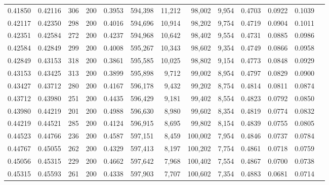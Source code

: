 \begin{tabular}{rrrrrrrrrrrrr}
0.41850 & 0.42116 &   306 & 200 &                                     0.3953 & 594,398 &  11,212 &  98,002 &   9,954 & 0.4703 & 0.0922 & 0.1039 \\
0.42117 & 0.42350 &   298 & 200 &                                     0.4016 & 594,696 &  10,914 &  98,202 &   9,754 & 0.4719 & 0.0904 & 0.1011 \\
0.42351 & 0.42584 &   272 & 200 &                                     0.4237 & 594,968 &  10,642 &  98,402 &   9,554 & 0.4731 & 0.0885 & 0.0986 \\
0.42584 & 0.42849 &   299 & 200 &                                     0.4008 & 595,267 &  10,343 &  98,602 &   9,354 & 0.4749 & 0.0866 & 0.0958 \\
0.42849 & 0.43153 &   318 & 200 &                                     0.3861 & 595,585 &  10,025 &  98,802 &   9,154 & 0.4773 & 0.0848 & 0.0929 \\
0.43153 & 0.43425 &   313 & 200 &                                     0.3899 & 595,898 &   9,712 &  99,002 &   8,954 & 0.4797 & 0.0829 & 0.0900 \\
0.43427 & 0.43712 &   280 & 200 &                                     0.4167 & 596,178 &   9,432 &  99,202 &   8,754 & 0.4814 & 0.0811 & 0.0874 \\
0.43712 & 0.43980 &   251 & 200 &                                     0.4435 & 596,429 &   9,181 &  99,402 &   8,554 & 0.4823 & 0.0792 & 0.0850 \\
0.43980 & 0.44219 &   201 & 200 &                                     0.4988 & 596,630 &   8,980 &  99,602 &   8,354 & 0.4819 & 0.0774 & 0.0832 \\
0.44219 & 0.44521 &   285 & 200 &                                     0.4124 & 596,915 &   8,695 &  99,802 &   8,154 & 0.4839 & 0.0755 & 0.0805 \\
0.44523 & 0.44766 &   236 & 200 &                                     0.4587 & 597,151 &   8,459 & 100,002 &   7,954 & 0.4846 & 0.0737 & 0.0784 \\
0.44767 & 0.45055 &   262 & 200 &                                     0.4329 & 597,413 &   8,197 & 100,202 &   7,754 & 0.4861 & 0.0718 & 0.0759 \\
0.45056 & 0.45315 &   229 & 200 &                                     0.4662 & 597,642 &   7,968 & 100,402 &   7,554 & 0.4867 & 0.0700 & 0.0738 \\
0.45315 & 0.45593 &   261 & 200 &                                     0.4338 & 597,903 &   7,707 & 100,602 &   7,354 & 0.4883 & 0.0681 & 0.0714 \\

\end{tabular}
